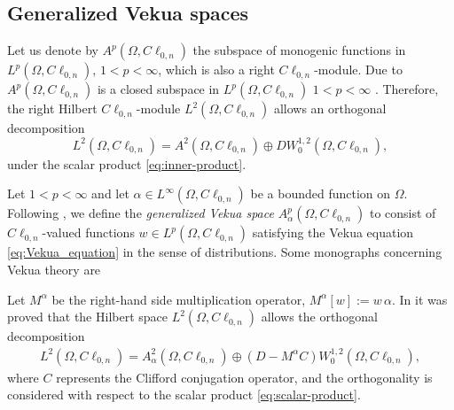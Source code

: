 \documentclass[12pt]{article}
\def\H{\mathbb{H}}
\def\R{\mathbb{R}}
\begin{document}
\subsection{Generalized Vekua spaces}\label{sec:Bergman-Vekua spaces}
Let us denote by $A^p(\Omega,C\ell_{0,n})$ the subspace of monogenic functions in $L^p(\Omega,C\ell_{0,n})$, $1<p<\infty$, which is also a right $C\ell_{0,n}$-module. Due to $A^p(\Omega,C\ell_{0,n})$ is a closed subspace in $L^p(\Omega, C\ell_{0,n})$ $1<p<\infty$ \cite[Prop.\ 3.73]{GuSpr1997}.
Therefore, the right Hilbert $C\ell_{0,n}$-module $L^2(\Omega, C\ell_{0,n})$ allows an orthogonal decomposition
\[
   L^2(\Omega, C\ell_{0,n})=A^2(\Omega,C\ell_{0,n})\oplus DW_0^{1,2}(\Omega,C\ell_{0,n}),
\]
under the scalar product \eqref{eq:inner-product}.




Let $1<p<\infty$ and let $\alpha\in L^{\infty}(\Omega,C\ell_{0,n})$ be a bounded function on $\Omega$. Following \cite{Delgado2023}, we define the \textit{generalized Vekua space} $A_{\alpha}^p(\Omega,C\ell_{0,n})$ to consist of $C\ell_{0,n}$-valued functions $w \in L^p(\Omega,C\ell_{0,n})$ satisfying the Vekua equation \eqref{eq:Vekua_equation} in the sense of distributions. Some monographs concerning Vekua theory are \cite{Vekua1962, Bers1953, Krav2009}

Let $M^{\alpha}$ be the right-hand side multiplication operator, $M^{\alpha}[w]:=w\, \alpha$. In \cite[Th.\ 11]{Delgado2023} it was proved that the Hilbert space $L^2(\Omega,C\ell_{0,n})$ allows the orthogonal decomposition 
\begin{align}\label{eq:Hodge-2}  
L^2(\Omega,C\ell_{0,n})=A_{\alpha}^2(\Omega,C\ell_{0,n})\oplus (D-M^{\alpha}C) W_0^{1,2}(\Omega,C\ell_{0,n}),
\end{align} 
where $C$ represents the Clifford conjugation operator, and the orthogonality is considered with respect to the scalar product \eqref{eq:scalar-product}.
\end{document}
